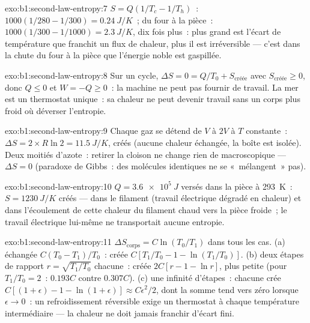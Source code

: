 \begin{solution}{exo:b1:second-law-entropy:7}
$S = Q(1/T_c - 1/T_h)$~: $1000(1/280 - 1/300) = \qty{0.24}{J/K}$~; du four à la
pièce~: $1000(1/300 - 1/1000) = \qty{2.3}{J/K}$, dix fois plus~: plus grand est
l'écart de température que franchit un flux de chaleur, plus il est
irréversible --- c'est dans la chute du four à la pièce que l'énergie noble est gaspillée.
\end{solution}

\begin{solution}{exo:b1:second-law-entropy:8}
Sur un cycle, $\Delta S = 0 = Q/T_0 + S_{\text{créée}}$ avec $S_{\text{créée}} \geq 0$,
donc $Q \leq 0$ et $W = -Q \geq 0$~: la machine ne peut pas fournir de travail.
La mer est un thermostat unique~: sa chaleur ne peut devenir travail sans un
corps plus froid où déverser l'entropie.
\end{solution}

\begin{solution}{exo:b1:second-law-entropy:9}
Chaque gaz se détend de $V$ à $2V$ à $T$ constante~: $\Delta S = 2 \times R\ln2
= \qty{11.5}{J/K}$, créés (aucune chaleur échangée, la boîte est isolée). Deux
moitiés d'azote~: retirer la cloison ne change rien de macroscopique ---
$\Delta S = 0$ (paradoxe de Gibbs~: des molécules identiques ne se «~mélangent~» pas).
\end{solution}

\begin{solution}{exo:b1:second-law-entropy:10}
$Q = \qty{3.6e5}{J}$ versés dans la pièce à \qty{293}{K}~: $S = \qty{1230}{J/K}$
créés --- dans le filament (travail électrique dégradé en chaleur) et dans
l'écoulement de cette chaleur du filament chaud vers la pièce froide~; le
travail électrique lui-même ne transportait aucune entropie.
\end{solution}

\begin{solution}{exo:b1:second-law-entropy:11}
$\Delta S_{\text{corps}} = C\ln(T_0/T_1)$ dans tous les cas. (a) échangée
$C(T_0 - T_1)/T_0$~: créée $C[T_1/T_0 - 1 - \ln(T_1/T_0)]$. (b) deux étapes de
rapport $r = \sqrt{T_1/T_0}$ chacune~: créée $2C[r - 1 - \ln r]$, plus petite
(pour $T_1/T_0 = 2$~: $0.193C$ contre $0.307C$). (c) une infinité d'étapes~:
chacune crée $C[(1 + \epsilon) - 1 - \ln(1 + \epsilon)] \approx C\epsilon^2/2$,
dont la somme tend vers zéro lorsque $\epsilon \to 0$~: un refroidissement réversible
exige un thermostat à chaque température intermédiaire --- la chaleur ne doit jamais franchir d'écart fini.
\end{solution}

